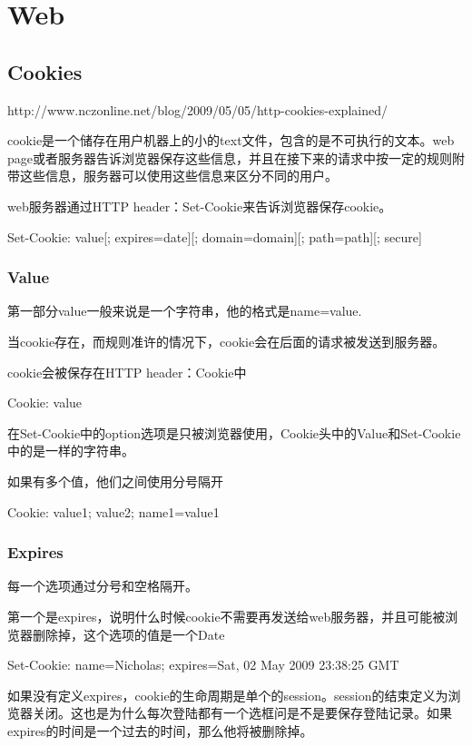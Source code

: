 \chapter{Web}

\section{Cookies}

http://www.nczonline.net/blog/2009/05/05/http-cookies-explained/

cookie是一个储存在用户机器上的小的text文件，包含的是不可执行的文本。web page或者服务器告诉浏览器保存这些信息，并且在接下来的请求中按一定的规则附带这些信息，服务器可以使用这些信息来区分不同的用户。

web服务器通过HTTP header：Set-Cookie来告诉浏览器保存cookie。
\begin{HTML5}
Set-Cookie: value[; expires=date][; domain=domain][; path=path][; secure]
\end{HTML5}

\subsection{Value}

第一部分value一般来说是一个字符串，他的格式是name=value.

当cookie存在，而规则准许的情况下，cookie会在后面的请求被发送到服务器。

cookie会被保存在HTTP header：Cookie中
\begin{HTML5}
Cookie: value
\end{HTML5}
在Set-Cookie中的option选项是只被浏览器使用，Cookie头中的Value和Set-Cookie中的是一样的字符串。

如果有多个值，他们之间使用分号隔开
\begin{HTML5}
Cookie: value1; value2; name1=value1
\end{HTML5}

\subsection{Expires}

每一个选项通过分号和空格隔开。

第一个是expires，说明什么时候cookie不需要再发送给web服务器，并且可能被浏览器删除掉，这个选项的值是一个Date
\begin{HTML5}
Set-Cookie: name=Nicholas; expires=Sat, 02 May 2009 23:38:25 GMT
\end{HTML5}
如果没有定义expires，cookie的生命周期是单个的session。session的结束定义为浏览器关闭。这也是为什么每次登陆都有一个选框问是不是要保存登陆记录。如果expires的时间是一个过去的时间，那么他将被删除掉。

